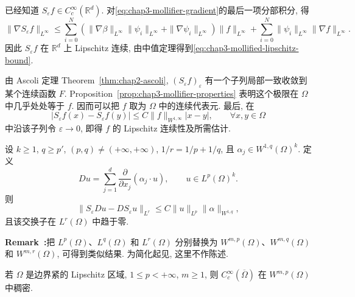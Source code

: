\begin{Proof}
已经知道 $S_\varepsilon f\in C_c^\infty(\mathbb R^d)$. 对\eqref{eq:chap3-mollifier-gradient}的最后一项分部积分, 得
\[
 \|\nabla S_\varepsilon f\|_{L^\infty}
 \leq\sum_{i=0}^N
 (\|\nabla\beta\|_{L^\infty}\|\psi_i\|_{L^\infty}
 +\|\nabla\psi_i\|_{L^\infty})\|f\|_{L^\infty}
 +\sum_{i=0}^N\|\psi_i\|_{L^\infty}\|\nabla f\|_{L^\infty}.
\]
因此 $S_\varepsilon f$ 在 $\mathbb R^d$ 上 Lipschitz 连续, 由中值定理得到\eqref{eq:chap3-mollified-lipschitz-bound}.

由 Ascoli 定理 Theorem~\ref{thm:chap2-ascoli}, $(S_\varepsilon f)_\varepsilon$ 有一个子列局部一致收敛到某个连续函数 $F$. Proposition~\ref{prop:chap3-mollifier-properties} 表明这个极限在 $\Omega$ 中几乎处处等于 $f$. 因而可以把 $f$ 取为 $\Omega$ 中的连续代表元. 最后, 在
\[
 |S_\varepsilon f(x)-S_\varepsilon f(y)|
 \leq C\|f\|_{W^{1,\infty}}|x-y|,
 \qquad\forall x,y\in\Omega
\]
中沿该子列令 $\varepsilon\to0$, 即得 $f$ 的 Lipschitz 连续性及所需估计.
\end{Proof}

\begin{Theorem}
\label{thm:chap3-friedrichs-commutator}
设 $k\geq1$, $q\geq p'$, $(p,q)\neq(+\infty,+\infty)$, $1/r=1/p+1/q$, 且 $\alpha_j\in W^{1,q}(\Omega)^k$. 定义
\begin{equation}
 Du=\sum_{j=1}^d\frac{\partial}{\partial x_j}(\alpha_j\cdot u),
 \qquad u\in L^p(\Omega)^k.
 \label{eq:chap3-first-order-divergence-operator}
\end{equation}
则
\begin{equation}
 \|S_\varepsilon Du-DS_\varepsilon u\|_{L^r}
 \leq C\|u\|_{L^p}\|\alpha\|_{W^{1,q}},
 \label{eq:chap3-friedrichs-commutator-bound}
\end{equation}
且该交换子在 $L^r(\Omega)$ 中趋于零.
\end{Theorem}

\par\noindent{}\textbf{Remark~\thechapterthreesectiontworemark:}\label{rem:chap3-higher-order-commutator}\quad 把 $L^p(\Omega)$、$L^q(\Omega)$ 和 $L^r(\Omega)$ 分别替换为 $W^{m,p}(\Omega)$、$W^{m,q}(\Omega)$ 和 $W^{m,r}(\Omega)$, 可得到类似结果. 为简化起见, 这里不作陈述.

\begin{Theorem}
\label{thm:chap3-smooth-density-sobolev}
若 $\Omega$ 是边界紧的 Lipschitz 区域, $1\leq p<+\infty$, $m\geq1$, 则 $C_c^\infty(\overline\Omega)$ 在 $W^{m,p}(\Omega)$ 中稠密.
\end{Theorem}

